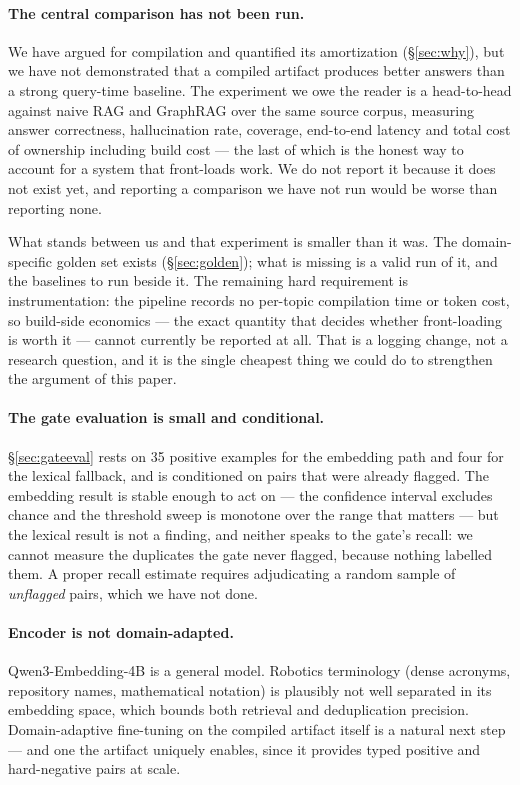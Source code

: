 \documentclass[10pt,a4paper]{article}
\begin{document}
\paragraph{The central comparison has not been run.} We have argued for
compilation and quantified its amortization (\S\ref{sec:why}), but we have not
demonstrated that a compiled artifact produces better answers than a strong
query-time baseline. The experiment we owe the reader is a head-to-head against
naive RAG and GraphRAG over the same source corpus, measuring answer correctness,
hallucination rate, coverage, end-to-end latency and total cost of ownership
including build cost --- the last of which is the honest way to account for a
system that front-loads work. We do not report it because it does not exist yet,
and reporting a comparison we have not run would be worse than reporting none.

What stands between us and that experiment is smaller than it was. The
domain-specific golden set exists (\S\ref{sec:golden}); what is missing is a
valid run of it, and the baselines to run beside it. The remaining hard
requirement is instrumentation: the pipeline records no per-topic compilation
time or token cost, so build-side economics --- the exact quantity that decides
whether front-loading is worth it --- cannot currently be reported at all. That
is a logging change, not a research question, and it is the single cheapest thing
we could do to strengthen the argument of this paper.

\paragraph{The gate evaluation is small and conditional.} \S\ref{sec:gateeval}
rests on 35 positive examples for the embedding path and four for the lexical
fallback, and is conditioned on pairs that were already flagged. The embedding
result is stable enough to act on --- the confidence interval excludes chance and
the threshold sweep is monotone over the range that matters --- but the lexical
result is not a finding, and neither speaks to the gate's recall: we cannot
measure the duplicates the gate never flagged, because nothing labelled them. A
proper recall estimate requires adjudicating a random sample of \emph{unflagged}
pairs, which we have not done.

\paragraph{Encoder is not domain-adapted.} Qwen3-Embedding-4B is a general model.
Robotics terminology (dense acronyms, repository names, mathematical notation) is
plausibly not well separated in its embedding space, which bounds both retrieval
and deduplication precision. Domain-adaptive fine-tuning on the compiled artifact
itself is a natural next step --- and one the artifact uniquely enables, since it
provides typed positive and hard-negative pairs at scale.
\end{document}
